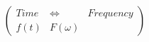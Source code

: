 \documentclass[preview]{standalone}
\begin{document}
\begin{align*}
\left( \begin{array}{cl} Time & \Longleftrightarrow & Frequency \\ f(t) & F(\omega) \end{array} \right)
\end{align*}
\end{document}
